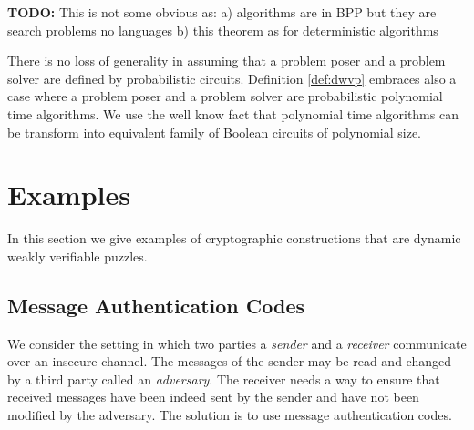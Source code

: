 \documentclass[11pt,a4paper,titlepage]{memoir}
\begin{document}
\begin{todo}
  \textbf{TODO:} This is not some obvious as: a) algorithms are in BPP but they are search problems no languages b) this theorem as for deterministic algorithms
\end{todo}

There is no loss of generality in assuming that a problem poser and a problem solver are defined by probabilistic circuits.
Definition \ref{def:dwvp} embraces also a case where a problem poser and a problem solver are probabilistic polynomial time algorithms.
We use the well know fact \cite{LectureNotesCT} that polynomial time algorithms can be transform into equivalent family of Boolean circuits of polynomial size.

\section{Examples}
\label{section:wvp_examples}
In this section we give examples of cryptographic constructions that are dynamic weakly verifiable puzzles.

\subsection{Message Authentication Codes}
We consider the setting in which two parties a \textit{sender} and a \textit{receiver} communicate over an insecure channel.
The messages of the sender may be read and changed by a third party called an \textit{adversary}.
The receiver needs a way to ensure that received messages have been indeed sent by the sender and have not been modified by the adversary.
The solution is to use message authentication codes.
\end{document}
